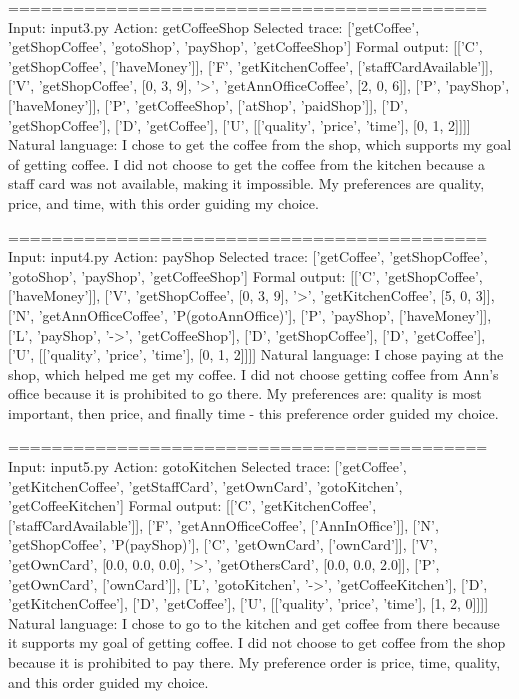 \documentclass{article}
\begin{document}
============================================
Input: input3.py
Action: getCoffeeShop
Selected trace: ['getCoffee', 'getShopCoffee', 'gotoShop', 'payShop', 'getCoffeeShop']
Formal output: [['C', 'getShopCoffee', ['haveMoney']], ['F', 'getKitchenCoffee', ['staffCardAvailable']], ['V', 'getShopCoffee', [0, 3, 9], '>', 'getAnnOfficeCoffee', [2, 0, 6]], ['P', 'payShop', ['haveMoney']], ['P', 'getCoffeeShop', ['atShop', 'paidShop']], ['D', 'getShopCoffee'], ['D', 'getCoffee'], ['U', [['quality', 'price', 'time'], [0, 1, 2]]]]
Natural language: I chose to get the coffee from the shop, which supports my goal of getting coffee. I did not choose to get the coffee from the kitchen because a staff card was not available, making it impossible. My preferences are quality, price, and time, with this order guiding my choice.

============================================
Input: input4.py
Action: payShop
Selected trace: ['getCoffee', 'getShopCoffee', 'gotoShop', 'payShop', 'getCoffeeShop']
Formal output: [['C', 'getShopCoffee', ['haveMoney']], ['V', 'getShopCoffee', [0, 3, 9], '>', 'getKitchenCoffee', [5, 0, 3]], ['N', 'getAnnOfficeCoffee', 'P(gotoAnnOffice)'], ['P', 'payShop', ['haveMoney']], ['L', 'payShop', '->', 'getCoffeeShop'], ['D', 'getShopCoffee'], ['D', 'getCoffee'], ['U', [['quality', 'price', 'time'], [0, 1, 2]]]]
Natural language: I chose paying at the shop, which helped me get my coffee. I did not choose getting coffee from Ann's office because it is prohibited to go there. My preferences are: quality is most important, then price, and finally time - this preference order guided my choice.

============================================
Input: input5.py
Action: gotoKitchen
Selected trace: ['getCoffee', 'getKitchenCoffee', 'getStaffCard', 'getOwnCard', 'gotoKitchen', 'getCoffeeKitchen']
Formal output: [['C', 'getKitchenCoffee', ['staffCardAvailable']], ['F', 'getAnnOfficeCoffee', ['AnnInOffice']], ['N', 'getShopCoffee', 'P(payShop)'], ['C', 'getOwnCard', ['ownCard']], ['V', 'getOwnCard', [0.0, 0.0, 0.0], '>', 'getOthersCard', [0.0, 0.0, 2.0]], ['P', 'getOwnCard', ['ownCard']], ['L', 'gotoKitchen', '->', 'getCoffeeKitchen'], ['D', 'getKitchenCoffee'], ['D', 'getCoffee'], ['U', [['quality', 'price', 'time'], [1, 2, 0]]]]
Natural language: I chose to go to the kitchen and get coffee from there because it supports my goal of getting coffee. I did not choose to get coffee from the shop because it is prohibited to pay there. My preference order is price, time, quality, and this order guided my choice.
\end{document}
